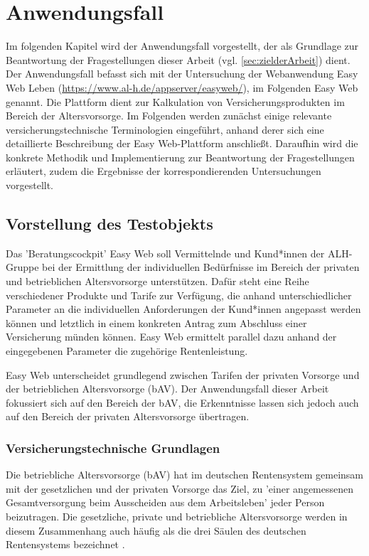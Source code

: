 \chapter{Anwendungsfall}\label{chap:anwendungsfall}

Im folgenden Kapitel wird der Anwendungsfall vorgestellt, der als Grundlage zur Beantwortung der Fragestellungen dieser Arbeit (vgl. \autoref{sec:zielderArbeit}) dient. Der Anwendungsfall befasst sich mit der Untersuchung der Webanwendung Easy Web Leben \cite{easy_web}(\url{https://www.al-h.de/appserver/easyweb/}), im Folgenden Easy Web genannt. Die Plattform dient zur Kalkulation von Versicherungsprodukten im Bereich der Altersvorsorge. Im Folgenden werden zunächst einige relevante versicherungstechnische Terminologien eingeführt, anhand derer sich eine detaillierte Beschreibung der Easy Web-Plattform anschließt. Daraufhin wird die konkrete Methodik und Implementierung zur Beantwortung der Fragestellungen erläutert, zudem die Ergebnisse der korrespondierenden Untersuchungen vorgestellt.

\section{Vorstellung des Testobjekts}\label{sec:testobjekt}

Das 'Beratungscockpit' Easy Web \cite{easy_web} soll Vermittelnde und Kund*innen der ALH-Gruppe bei der Ermittlung der individuellen Bedürfnisse im Bereich der privaten und betrieblichen Altersvorsorge unterstützen. Dafür steht eine Reihe verschiedener Produkte und Tarife zur Verfügung, die anhand unterschiedlicher Parameter an die individuellen Anforderungen der Kund*innen angepasst werden können und letztlich in einem konkreten Antrag zum Abschluss einer Versicherung münden können. Easy Web ermittelt parallel dazu anhand der eingegebenen Parameter die zugehörige Rentenleistung.

Easy Web unterscheidet grundlegend zwischen Tarifen der privaten Vorsorge und der betrieblichen Altersvorsorge (bAV). Der Anwendungsfall dieser Arbeit fokussiert sich auf den Bereich der bAV, die Erkenntnisse lassen sich jedoch auch auf den Bereich der privaten Altersvorsorge übertragen.

\subsection{Versicherungstechnische Grundlagen}\label{subsec:versicherungsgrundlagen}

Die betriebliche Altersvorsorge (bAV) hat im deutschen Rentensystem gemeinsam mit der gesetzlichen und der privaten Vorsorge das Ziel, zu 'einer angemessenen Gesamtversorgung beim Ausscheiden aus dem Arbeitsleben' \cite[S. 12]{buttler2017einfuehrung} jeder Person beizutragen. Die gesetzliche, private und betriebliche Altersvorsorge werden in diesem Zusammenhang auch häufig als die drei Säulen des deutschen Rentensystems bezeichnet \cite[S. 3]{plato2016betriebliche}. 

